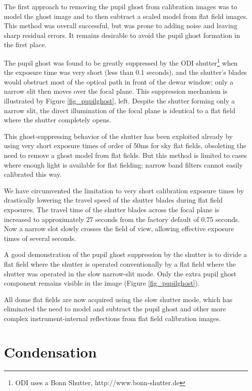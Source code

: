 \documentclass[]{spieman}
\begin{document}
The first approach to removing the pupil ghost from calibration images was to
model the ghost image and to then subtract a scaled model from flat field
images. This method was overall successful, but was prone to adding noise and
leaving sharp residual errors. It remains desirable to avoid the pupil ghost
formation in the first place.

The pupil ghost was found to be greatly suppressed by the ODI
shutter\footnote{ODI uses a Bonn Shutter, http://www.bonn-shutter.de} when the
exposure time was very short (less than 0.1 seconds), and the shutter's blades
would obstruct most of the optical path in front of the dewar window; only a
narrow slit then moves  over the focal plane. This suppression mechanism is
illustrated by Figure \ref{fig_pupilghost}, left. Despite the shutter forming
only a narrow slit, the direct illumination of the focal plane is identical to a
flat field where the shutter completely opens.

This ghost-suppressing behavior of the shutter has been exploited already by
using very short exposure times of order of 50ms for sky flat fields, obsoleting
the need to remove a ghost model from flat fields. But this method is limited to
cases where enough light is available for flat fielding; narrow band filters
cannot easily calibrated this way.

We have circumvented the limitation to very short calibration exposure times by
drastically lowering the travel speed of the shutter blades during flat field exposures.
The travel time of
the shutter blades across the focal plane is increased to approximately  27
seconds from the factory default of 0.75 seconds.  Now a narrow slot slowly
crosses the field of view, allowing effective exposure times of several seconds.

A good demonstration of the pupil ghost suppression by the shutter is to divide
a flat field where the shutter is operated conventionally by a flat field where
the shutter was operated in the slow narrow-slit mode. Only the extra pupil
ghost component remains visible in the image (Figure \ref{fig_pupilghost}).

All dome flat fields are now acquired using the slow shutter mode, which has
eliminated the need to model and subtract the pupil ghost and other more complex
instrument-internal reflections from flat field calibration images.

\section{Condensation}
\end{document}
